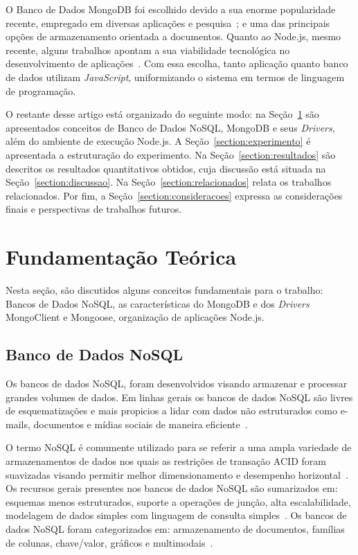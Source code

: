 \documentclass[12pt]{article}
\begin{document}
O Banco de Dados MongoDB foi escolhido devido a sua enorme popularidade recente, empregado em diversas aplicações e pesquisa~\cite{patil:2017,jung:2015,ongo:2018,kanade2014study}; e uma das principais opções de armazenamento orientada a documentos. Quanto ao Node.js, mesmo recente, alguns trabalhos apontam a sua viabilidade tecnológica no desenvolvimento de aplicações~\cite{chaniotis2015node}. Com essa escolha, tanto aplicação quanto banco de dados utilizam \textit{JavaScript}, uniformizando o sistema em termos de linguagem de programação.

O restante desse artigo está organizado do seguinte modo: na Seção~\ref{section:fundamentacao} são apresentados conceitos de Banco de Dados NoSQL, MongoDB e seus \emph{Drivers}, além do ambiente de execução Node.js. 
A Seção~\ref{section:experimento} é apresentada a estruturação do experimento. 
Na Seção~\ref{section:resultados} são descritos os resultados quantitativos obtidos, cuja discussão está situada na Seção~\ref{section:discussao}. Na Seção~\ref{section:relacionados} relata os trabalhos relacionados. Por fim, a Seção~\ref{section:consideracoes} expressa as considerações finais e perspectivas de trabalhos futuros.

\section{Fundamentação Teórica}
\label{section:fundamentacao}

Nesta seção, são discutidos alguns conceitos fundamentais para o trabalho: Bancos de Dados NoSQL, as características do MongoDB e dos \emph{Drivers} MongoClient e Mongoose, organização de aplicações Node.js. 

\subsection{Banco de Dados NoSQL}
\label{subsection:nao-relacional}

Os bancos de dados NoSQL, foram desenvolvidos visando armazenar e processar grandes volumes de dados. Em linhas gerais os bancos de dados NoSQL são livres de esquematizações e mais propicios a lidar com dados não estruturados como e-mails, documentos e mídias sociais de maneira eficiente~\cite{mohamed:2014,ramesh:2016}.

O termo NoSQL é comumente utilizado para se referir a uma ampla variedade de armazenamentos de dados nos quais as restrições de transação ACID foram suavizadas visando permitir melhor dimensionamento e desempenho horizontal~\cite{rafique:2018}. Os recursos gerais presentes nos bancos de dados NoSQL são sumarizados em: esquemas menos estruturados, suporte a operações de junção, alta escalabilidade, modelagem de dados simples com linguagem de consulta simples~\cite{ramesh:2016}. Os bancos de dados NoSQL foram categorizados em: armazenamento de documentos, famílias de colunas, chave/valor, gráficos e multimodais~\cite{aparicio:2016}.
\end{document}
